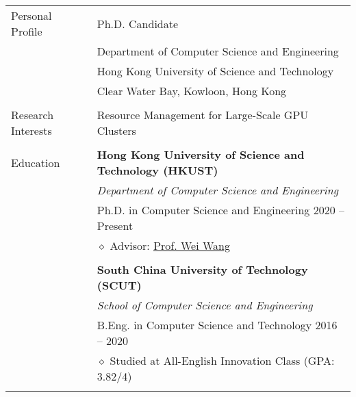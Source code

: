 \documentclass[letterpaper, 11pt]{article}
\begin{document}
\begin{longtable}{p{1in}p{5in}}

{Personal Profile}
& Ph.D. Candidate \\
& Department of Computer Science and Engineering \\
& Hong Kong University of Science and Technology \\
& Clear Water Bay, Kowloon, Hong Kong \\
& \\

\nohyphens{Research Interests}
& Resource Management for Large-Scale GPU Clusters \\
& \\

{Education}
& \textbf{Hong Kong University of Science and Technology (HKUST)} \\
& \textit{Department of Computer Science and Engineering} \\
& Ph.D. in Computer Science and Engineering \hfill 2020 -- Present \\
& $\diamond$ Advisor: \href{https://www.cse.ust.hk/~weiwa/index.html}{\underline{Prof. Wei Wang}} \\
& \\

& \textbf{South China University of Technology (SCUT)} \\
& \textit{School of Computer Science and Engineering} \\
& B.Eng. in Computer Science and Technology \hfill 2016 -- 2020 \\
& $\diamond$ Studied at All-English Innovation Class (GPA: 3.82/4) \\
& \\



\end{longtable}
\end{document}
